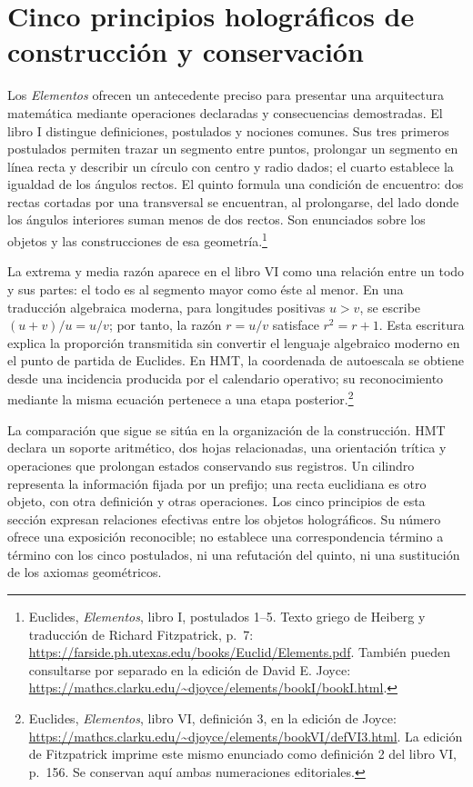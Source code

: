 \section*{Cinco principios holográficos de construcción y conservación}

Los \emph{Elementos} ofrecen un antecedente preciso para presentar una
arquitectura matemática mediante operaciones declaradas y consecuencias
demostradas. El libro I distingue definiciones, postulados y nociones comunes.
Sus tres primeros postulados permiten trazar un segmento entre puntos,
prolongar un segmento en línea recta y describir un círculo con centro y radio
dados; el cuarto establece la igualdad de los ángulos rectos. El quinto
formula una condición de encuentro: dos rectas cortadas por una transversal
se encuentran, al prolongarse, del lado donde los ángulos interiores suman
menos de dos rectos. Son enunciados sobre los objetos y las construcciones de
esa geometría.\footnote{Euclides, \emph{Elementos}, libro I, postulados 1--5.
Texto griego de Heiberg y traducción de Richard Fitzpatrick, p.~7:
\url{https://farside.ph.utexas.edu/books/Euclid/Elements.pdf}. También pueden
consultarse por separado en la edición de David E. Joyce:
\url{https://mathcs.clarku.edu/~djoyce/elements/bookI/bookI.html}.}

La extrema y media razón aparece en el libro VI como una relación entre un
todo y sus partes: el todo es al segmento mayor como éste al menor. En una
traducción algebraica moderna, para longitudes positivas \(u>v\), se escribe
\((u+v)/u=u/v\); por tanto, la razón \(r=u/v\) satisface
\(r^2=r+1\). Esta escritura explica la proporción transmitida sin convertir
el lenguaje algebraico moderno en el punto de partida de Euclides. En HMT,
la coordenada de autoescala se obtiene desde una incidencia producida por el
calendario operativo; su reconocimiento mediante la misma ecuación pertenece
a una etapa posterior.\footnote{Euclides, \emph{Elementos}, libro VI,
definición 3, en la edición de Joyce:
\url{https://mathcs.clarku.edu/~djoyce/elements/bookVI/defVI3.html}.
La edición de Fitzpatrick imprime este mismo enunciado como definición 2
del libro VI, p.~156. Se conservan aquí ambas numeraciones editoriales.}

La comparación que sigue se sitúa en la organización de la construcción.
HMT declara un soporte aritmético, dos hojas relacionadas, una orientación
trítica y operaciones que prolongan estados conservando sus registros. Un
cilindro representa la información fijada por un prefijo; una recta
euclidiana es otro objeto, con otra definición y otras operaciones. Los
cinco principios de esta sección expresan relaciones efectivas entre los
objetos holográficos. Su número ofrece una exposición reconocible; no
establece una correspondencia término a término con los cinco postulados,
ni una refutación del quinto, ni una sustitución de los axiomas geométricos.

